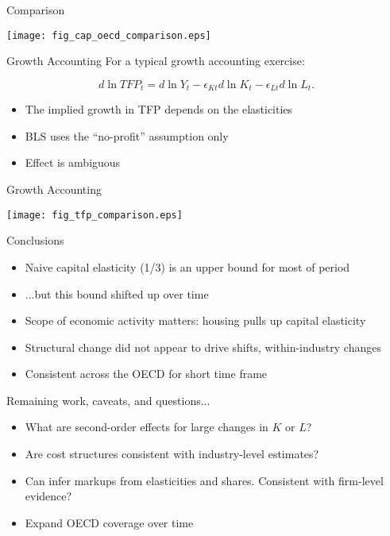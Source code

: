 \documentclass[10pt, xcolor=dvipsnames]{beamer}
\begin{document}
\begin{frame}{Comparison}
\begin{center}
\texttt{[image: fig\_cap\_oecd\_comparison.eps]}
\end{center}
\end{frame}

\begin{frame}{Growth Accounting}
For a typical growth accounting exercise:

\begin{equation}
  d \ln TFP_t = d \ln Y_t - \epsilon_{Kt} d \ln K_t - \epsilon_{Lt} d \ln L_t. \label{EQ_accounting}
\end{equation}

\begin{itemize}
  \item The implied growth in TFP depends on the elasticities
  \item BLS uses the ``no-profit'' assumption only
  \item Effect is ambiguous 
\end{itemize}

\end{frame}

\begin{frame}{Growth Accounting}
\begin{center}
\texttt{[image: fig\_tfp\_comparison.eps]}
\end{center}
\end{frame}

\begin{frame}{Conclusions}
\begin{itemize}
  \item Naive capital elasticity (1/3) is an upper bound for most of period
  \item ...but this bound shifted up over time
  \item Scope of economic activity matters: housing pulls up capital elasticity
  \item Structural change did not appear to drive shifts, within-industry changes
  \item Consistent across the OECD for short time frame
\end{itemize}
\vspace{.25in}
Remaining work, caveats, and questions...
\begin{itemize}
  \item What are second-order effects for large changes in $K$ or $L$?
  \item Are cost structures consistent with industry-level estimates?
  \item Can infer markups from elasticities and shares. Consistent with firm-level evidence?
  \item Expand OECD coverage over time
\end{itemize}
\end{frame}
\end{document}
